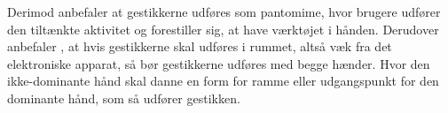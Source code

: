 Derimod anbefaler \textcite[s. 823]{PDF:UnderstandingNaturalness} at gestikkerne udføres som pantomime, hvor brugere udfører den tiltænkte aktivitet og forestiller sig, at have værktøjet i hånden. Derudover anbefaler \textcite[s. 824]{PDF:UnderstandingNaturalness}, at hvis gestikkerne skal udføres i rummet, altså væk fra det elektroniske apparat, så bør gestikkerne udføres med begge hænder. Hvor den ikke-dominante hånd skal danne en form for ramme eller udgangspunkt for den dominante hånd, som så udfører gestikken.      
%
